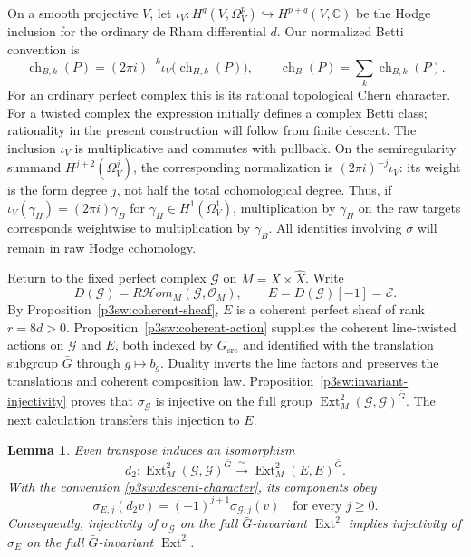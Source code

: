 \documentclass[11pt]{article}
\newcommand{\C}{\mathbb C}
\newtheorem{lemma}[theorem]{Lemma}
\numberwithin{equation}{section}
\begin{document}
On a smooth projective \(V\), let
\(\iota_V:H^q(V,\Omega_V^p)\hookrightarrow H^{p+q}(V,\C)\) be the
Hodge inclusion for the ordinary de Rham differential \(d\).  Our
normalized Betti convention is
\begin{equation}
\label{p3sw:descent-tate}
 \operatorname{ch}_{B,k}(P)
   =(2\pi i)^{-k}\iota_V\bigl(\operatorname{ch}_{H,k}(P)\bigr),
 \qquad
 \operatorname{ch}_B(P)=\sum_k\operatorname{ch}_{B,k}(P).
\end{equation}
For an ordinary perfect complex this is its rational topological Chern
character.  For a twisted complex the expression initially defines a
complex Betti class; rationality in the present construction will follow
from finite descent.  The inclusion \(\iota_V\) is multiplicative and
commutes with pullback.  On the semiregularity summand
\(H^{j+2}(\Omega_V^j)\), the corresponding normalization is
\((2\pi i)^{-j}\iota_V\): its weight is the form degree \(j\), not half
the total cohomological degree.  Thus, if
\(\iota_V(\gamma_H)=(2\pi i)\gamma_B\) for
\(\gamma_H\in H^1(\Omega_V^1)\), multiplication by \(\gamma_H\) on the
raw targets corresponds weightwise to multiplication by \(\gamma_B\).
All identities involving \(\sigma\) will remain in raw Hodge cohomology.

Return to the fixed perfect complex \(\mathcal G\) on
\(M=X\times\widehat X\).  Write
\[
 D(\mathcal G)=R\mathcal{H}om_M(\mathcal G,\mathcal O_M),
 \qquad E=D(\mathcal G)[-1]=\mathcal E.
\]
By Proposition~\ref{p3sw:coherent-sheaf}, \(E\) is a coherent
perfect sheaf of rank \(r=8d>0\).
Proposition~\ref{p3sw:coherent-action} supplies the coherent
line-twisted actions on \(\mathcal G\) and \(E\), both indexed by
\(G_{\mathrm{src}}\) and identified with the translation subgroup
\(\bar G\) through \(g\mapsto b_g\).  Duality inverts the line
factors and preserves the translations and coherent composition law.
Proposition~\ref{p3sw:invariant-injectivity} proves that
\(\sigma_{\mathcal G}\) is injective on the full group
\(\operatorname{Ext}^2_M(\mathcal G,\mathcal G)^{\bar G}\).
The next calculation transfers this injection to \(E\).

\begin{lemma}
\label{p3sw:descent-duality}
Even transpose induces an isomorphism
\[
 d_2:\operatorname{Ext}^2_M(\mathcal G,\mathcal G)^{\bar G}
       \xrightarrow{\ \sim\ }
       \operatorname{Ext}^2_M(E,E)^{\bar G}.
\]
With the convention \eqref{p3sw:descent-character}, its components obey
\begin{equation}
\label{p3sw:descent-dual-sign}
 \sigma_{E,j}(d_2v)=(-1)^{j+1}\sigma_{\mathcal G,j}(v)
 \quad\text{for every }j\geq0.
\end{equation}
Consequently, injectivity of \(\sigma_{\mathcal G}\) on the full
\(\bar G\)-invariant \(\operatorname{Ext}^2\) implies injectivity of
\(\sigma_E\) on the full \(\bar G\)-invariant \(\operatorname{Ext}^2\).
\end{lemma}
\end{document}
